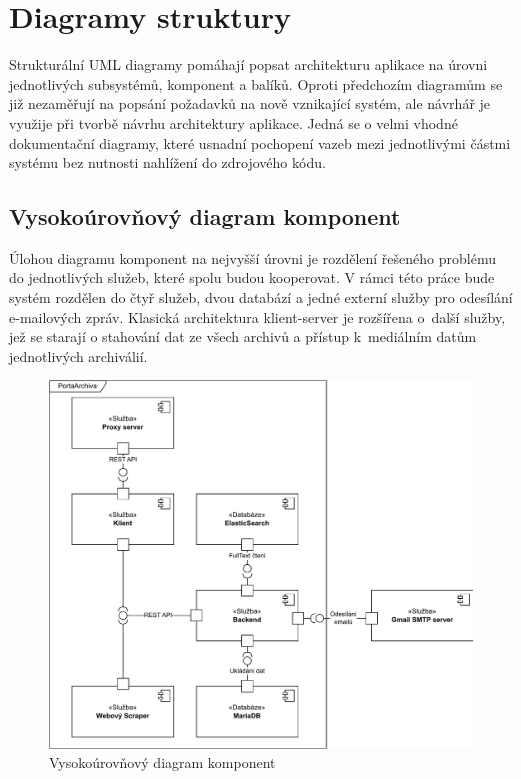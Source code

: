 \newpage
\section{Diagramy struktury}
Strukturální UML diagramy pomáhají popsat architekturu aplikace na úrovni jednotlivých subsystémů, komponent a balíků. Oproti předchozím diagramům se již nezaměřují na popsání požadavků na nově vznikající systém, ale návrhář je využije při tvorbě návrhu architektury aplikace. Jedná se o velmi vhodné dokumentační diagramy, které usnadní pochopení vazeb mezi jednotlivými částmi systému bez nutnosti nahlížení do zdrojového kódu.

\subsection{Vysokoúrovňový diagram komponent}
Úlohou diagramu komponent \cite{componentDiagram} na nejvyšší úrovni je rozdělení řešeného problému do jednotlivých služeb, které spolu budou kooperovat. V rámci této práce bude systém rozdělen do čtyř služeb, dvou databází a jedné externí služby pro odesílání e-mailových zpráv. Klasická architektura klient-server je rozšířena o~další služby, jež se starají o stahování dat ze všech archivů a přístup k~mediálním datům jednotlivých archiválií.

\begin{figure}[htbp]
\centering
    \includegraphics[scale=.72]{obrazky-figures/design/high_level_component_diagram.pdf}
    \caption{Vysokoúrovňový diagram komponent}
\end{figure}


